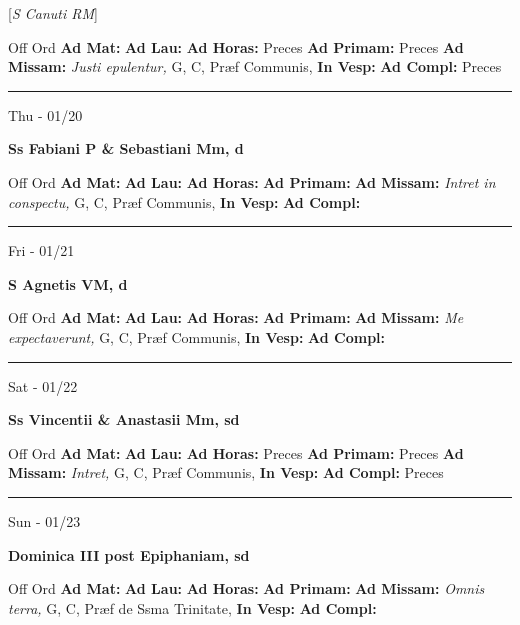 \documentclass[letterpaper, 10pt]{article}
\begin{document}
[\textit{S Canuti RM}]
\begin{justify}
Off Ord
\textbf{Ad Mat: }
\textbf{Ad Lau: }
\textbf{Ad Horas: }Preces
\textbf{Ad Primam: }Preces
\textbf{Ad Missam:} \textit{Justi epulentur, } G, C, Præf Communis, 
\textbf{In Vesp: }
\textbf{Ad Compl: }Preces\end{justify}



\hrule
\begin{center}
Thu - 01/20
\end{center}\textbf{ \large Ss Fabiani P \& Sebastiani Mm, \textnormal{\normalsize d}}
\begin{justify}
Off Ord
\textbf{Ad Mat: }
\textbf{Ad Lau: }
\textbf{Ad Horas: }
\textbf{Ad Primam: }
\textbf{Ad Missam:} \textit{Intret in conspectu, } G, C, Præf Communis, 
\textbf{In Vesp: }
\textbf{Ad Compl: }\end{justify}



\hrule
\begin{center}
Fri - 01/21
\end{center}\textbf{ \large S Agnetis VM, \textnormal{\normalsize d}}
\begin{justify}
Off Ord
\textbf{Ad Mat: }
\textbf{Ad Lau: }
\textbf{Ad Horas: }
\textbf{Ad Primam: }
\textbf{Ad Missam:} \textit{Me expectaverunt, } G, C, Præf Communis, 
\textbf{In Vesp: }
\textbf{Ad Compl: }\end{justify}



\hrule
\begin{center}
Sat - 01/22
\end{center}\textbf{ \large Ss Vincentii \& Anastasii Mm, \textnormal{\normalsize sd}}
\begin{justify}
Off Ord
\textbf{Ad Mat: }
\textbf{Ad Lau: }
\textbf{Ad Horas: }Preces
\textbf{Ad Primam: }Preces
\textbf{Ad Missam:} \textit{Intret, } G, C, Præf Communis, 
\textbf{In Vesp: }
\textbf{Ad Compl: }Preces\end{justify}



\hrule
\begin{center}
Sun - 01/23
\end{center}\textbf{ \large Dominica III post Epiphaniam, \textnormal{\normalsize sd}}
\begin{justify}
Off Ord
\textbf{Ad Mat: }
\textbf{Ad Lau: }
\textbf{Ad Horas: }
\textbf{Ad Primam: }
\textbf{Ad Missam:} \textit{Omnis terra, } G, C, Præf de Ssma Trinitate, 
\textbf{In Vesp: }
\textbf{Ad Compl: }\end{justify}
\end{document}

